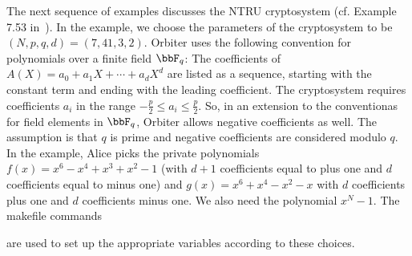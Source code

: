\bigskip


The next sequence of examples discusses the NTRU cryptosystem 
(cf. Example 7.53 in~\cite{Hoffstein2014}).
In the example, we choose the parameters of the cryptosystem to be $(N,p,q,d) = (7,41,3,2).$
Orbiter uses the following convention for polynomials over a finite field $\bbF_q$: 
The coefficients of $A(X) = a_0 + a_1X + \cdots + a_dX^d$ 
are listed as a sequence, starting with the constant term and ending with the leading coefficient.
The cryptosystem requires coefficients $a_i$ in the range $-\frac{p}{2} \le a_i \le \frac{p}{2}.$ 
So, in an extension to the conventionas for field elements in $\bbF_q$, 
Orbiter allows negative coefficients as well. 
The assumption is that $q$ is prime and 
negative coefficients are considered modulo $q.$
In the example, Alice picks the private polynomials 
$f(x) = x^6-x^4+x^3+x^2-1$ (with $d+1$ coefficients equal to 
plus one and $d$ coefficients equal to minus one) and 
$g(x) = x^6+x^4-x^2-x$ with $d$ coefficients plus one and $d$ coefficients minus one.
We also need the polynomial $x^N-1$. 
The makefile commands 
{\tt

}
{\tt

}
{\tt

}
{\tt

}
{\tt

}
{\tt

}
{\tt

}
are used to set up the appropriate variables according to these  choices. 

\bigskip


